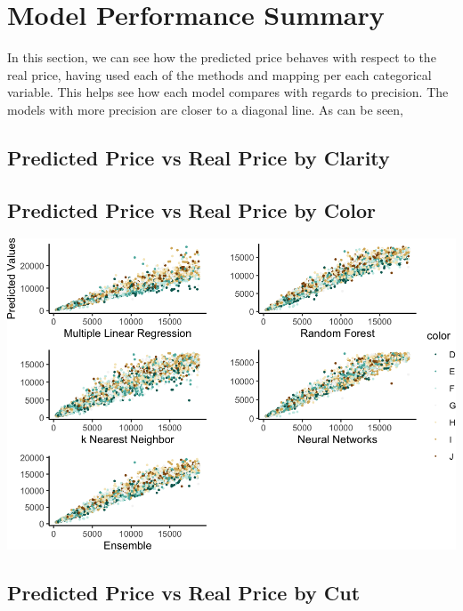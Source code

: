 \documentclass[
  paper=a4,
  ,captions=tableheading
]{scrartcl}
\begin{document}
\hypertarget{model-performance-summary}{%
\section{Model Performance Summary}\label{model-performance-summary}}

In this section, we can see how the predicted price behaves with respect
to the real price, having used each of the methods and mapping per each
categorical variable. This helps see how each model compares with
regards to precision. The models with more precision are closer to a
diagonal line. As can be seen,

\hypertarget{predicted-price-vs-real-price-by-clarity}{%
\subsection{Predicted Price vs Real Price by
Clarity}\label{predicted-price-vs-real-price-by-clarity}}

\hypertarget{predicted-price-vs-real-price-by-color}{%
\subsection{Predicted Price vs Real Price by
Color}\label{predicted-price-vs-real-price-by-color}}

\begin{center}\includegraphics{Diamonds_PDF_files/figure-latex/Summ Color Plots-1} \end{center}

\hypertarget{predicted-price-vs-real-price-by-cut}{%
\subsection{Predicted Price vs Real Price by
Cut}\label{predicted-price-vs-real-price-by-cut}}
\end{document}
